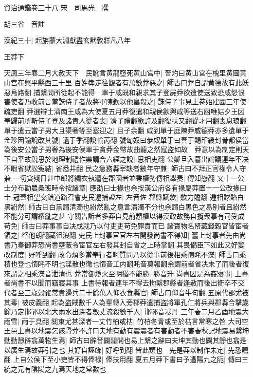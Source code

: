 資治通鑑卷三十八
宋　司馬光　撰

胡三省　音註

漢紀三十|{
	起旃蒙大淵獻盡玄黓敦牂凡八年}


王莽下

天鳳三年春二月大赦天下　民訛言黄龍墮死黄山宫中|{
	晉灼曰黄山宫在槐里黄圖黄山宫在興平縣西三十里}
百姓犇走往觀者有萬數莽惡之|{
	師古曰莽自謂黄德故有此妖惡烏路翻}
捕繫問所從起不能得　單于咸既和親求其子登屍莽欲遣使送致恐咸怨恨害使者乃收前言當誅侍子者故將軍陳欽以他辠殺之|{
	誅侍子事見上卷始建國三年使疏吏翻}
莽選辯士濟南王咸為大使夏五月莽復遣和親侯歙與咸等送右厨唯姑夕王因奉歸前所斬侍子登及諸貴人從者喪|{
	濟子禮翻歙許及翻復扶又翻從才用翻喪息琅翻}
單于遣云當子男大且渠奢等至塞迎之|{
	且子余翻}
咸到單于庭陳莽威德莽亦多遺單于金珍因諭說改其號|{
	遺于季翻說輸芮翻}
號匈奴曰恭奴單于曰善于賜印綬封骨都侯當為後安公當子男奢為後安侯單于貪莽金幣故曲聽之然寇盗如故　莽意以為制定則天下自平故銳思於地理制禮作樂講合六經之說|{
	思相吏翻}
公卿旦入暮出論議連年不决不暇省獄訟寃結|{
	省悉井翻}
民之急務縣宰缺者數年守兼|{
	師古曰不拜正官權令人守兼}
一切貪殘日甚中郎將繡衣執灋在郡國者並秉權勢傳相舉奏|{
	傳知戀翻}
又十一公士分布勸農桑班時令按諸章|{
	應劭曰士掾也余按漢公府各有掾屬莽置十一公改掾曰士}
冠蓋相望交錯道路召會吏民逮捕證左|{
	左音佐}
郡縣賦歛|{
	歛力贍翻}
逓相賕賂白黑紛然|{
	師古曰白黑謂清濁也紛然亂之意言清濁不分也余謂白黑色之易别者且紛然不能分可謂繆亂之甚}
守關告訴者多莽自見前顓權以得漢政故務自攬衆事有司受成苟免|{
	師古曰莽事事自决成就乃以付吏吏苟免罪責而已}
諸寶物名帑藏錢穀官皆宦者領之|{
	帑他朗翻藏徂浪翻}
吏民上封事宦官左右開發尚書不得知|{
	舊上封事者先由尚書乃奏御莽恐尚書壅蔽令宦官左右發其封自省之上時掌翻}
其畏備臣下如此又好變改制度|{
	好呼到翻}
政令煩多當奉行者輒質問乃以從事前後相乘憒眊不渫|{
	師古曰乘積也登也憒眊不明也渫散也徹也憒音工内翻眊音莫報翻余謂前者省决未了而後者復來謂之相乘渫音泄清也}
莽常御燈火至明猶不能勝|{
	勝音升}
尚書因是為姦寢事|{
	上書者尚書不以聞而竊寢其事}
上書待報者連年不得去拘繫郡縣者逢赦而後出衛卒不交代者至三歲穀糴常貴邊兵二十餘萬人仰衣食縣官|{
	師古曰仰音牛句翻}
五原代郡尤被其毒|{
	被皮義翻}
起為盗賊數千人為輩轉入旁郡莽遣捕盗將軍孔仁將兵與郡縣合擊歲餘乃定邯鄲以北大雨水出深者數丈流殺數千人|{
	邯鄲音寒丹}
三年春二月乙酉地震大雨雪|{
	雨于具翻}
關東尤甚深者一丈竹柏或枯|{
	竹柏冬青或至於枯言常寒之咎}
大司空王邑上書以地震乞骸骨莽不許曰夫地有動有震震者有害動者不害春秋記地震易繫坤動動靜辟翕萬物生焉|{
	師古曰辟音闢闢開也易上繫之辭曰夫坤其動也闢其靜也翕是以廣生焉故莽引之也}
其好自誣飾|{
	好呼到翻}
皆此類也　先是莽以制作未定|{
	先悉薦翻}
上自公侯下至小吏皆不得俸禄|{
	俸扶用翻}
夏五月莽下書曰予遭陽九之阨|{
	傳曰三統之元有隂陽之九焉天地之常數也}
